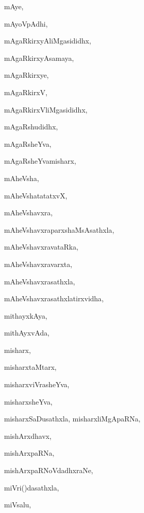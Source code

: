 \begin{multicols}{2}
{mAye}, \pageref{mAye}

{mAyoVpAdhi}, \pageref{mAyoVpAdhi}

{mAgaRkirxyAliMgasididhx}, \pageref{mAgaRkirxyAliMgasididhx}

{mAgaRkirxyAsamaya}, \pageref{mAgaRkirxyAsamaya}

{mAgaRkirxye}, \pageref{mAgaRkirxye}

{mAgaRkirxV}, \pageref{mAgaRkirxV}

{mAgaRkirxVliMgasididhx}, \pageref{mAgaRkirxVliMgasididhx}

{mAgaRshudidhx}, \pageref{mAgaRshudidhx}

{mAgaRsheYva}, \pageref{mAgaRsheYva}

{mAgaRsheYvamisharx}, \pageref{mAgaRsheYvamisharx}

{mAheVsha}, \pageref{mAheVsha}

{mAheVshatatatxvX}, \pageref{mAheVshatatatxvX}

{mAheVshavxra}, \pageref{mAheVshavxra}

{mAheVshavxraparxshaMsAsathxla}, \pageref{mAheVshavxraparxshaMsAsathxla}

{mAheVshavxravataRka}, \pageref{mAheVshavxravataRka}

{mAheVshavxravarxta}, \pageref{mAheVshavxravarxta}

{mAheVshavxrasathxla}, \pageref{mAheVshavxrasathxla}

{mAheVshavxrasathxlatirxvidha}, \pageref{mAheVshavxrasathxlatirxvidha}

{mithayxkAya}, \pageref{mithayxkAya}

{mithAyxvAda}, \pageref{mithAyxvAda}

{misharx}, \pageref{misharx}

{misharxtaMtarx}, \pageref{misharxtaMtarx}

{misharxviVrasheYva}, \pageref{misharxviVrasheYva}

{misharxsheYva}, \pageref{misharxsheYva}

{misharxSaDusathxla, misharxliMgApaRNa}, \pageref{misharxSaDusathxla, misharxliMgApaRNa}

{mishArxdhavx}, \pageref{mishArxdhavx}

{mishArxpaRNa}, \pageref{mishArxpaRNa}

{mishArxpaRNoVdadhxraNe}, \pageref{mishArxpaRNoVdadhxraNe}

{miVri(\ri)dasathxla}, \pageref{miVriridasathxla}

{miVsalu}, \pageref{miVsalu}


\end{multicols}
